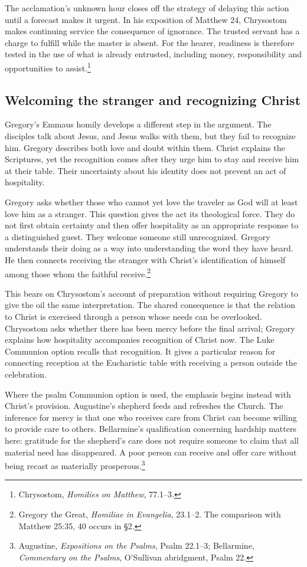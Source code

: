 The acclamation's unknown hour closes off the strategy of delaying this action until a forecast makes it urgent. In his exposition of Matthew 24, Chrysostom makes continuing service the consequence of ignorance. The trusted servant has a charge to fulfill while the master is absent. For the hearer, readiness is therefore tested in the use of what is already entrusted, including money, responsibility and opportunities to assist.\footnote{Chrysostom, \textit{Homilies on Matthew}, 77.1--3.}

\subsection{Welcoming the stranger and recognizing Christ}
Gregory's Emmaus homily develops a different step in the argument. The disciples talk about Jesus, and Jesus walks with them, but they fail to recognize him. Gregory describes both love and doubt within them. Christ explains the Scriptures, yet the recognition comes after they urge him to stay and receive him at their table. Their uncertainty about his identity does not prevent an act of hospitality.

Gregory asks whether those who cannot yet love the traveler as God will at least love him as a stranger. This question gives the act its theological force. They do not first obtain certainty and then offer hospitality as an appropriate response to a distinguished guest. They welcome someone still unrecognized. Gregory understands their doing as a way into understanding the word they have heard. He then connects receiving the stranger with Christ's identification of himself among those whom the faithful receive.\footnote{Gregory the Great, \textit{Homiliae in Evangelia}, 23.1--2. The comparison with Matthew 25:35, 40 occurs in §2.}

This bears on Chrysostom's account of preparation without requiring Gregory to give the oil the same interpretation. The shared consequence is that the relation to Christ is exercised through a person whose needs can be overlooked. Chrysostom asks whether there has been mercy before the final arrival; Gregory explains how hospitality accompanies recognition of Christ now. The Luke Communion option recalls that recognition. It gives a particular reason for connecting reception at the Eucharistic table with receiving a person outside the celebration.

Where the psalm Communion option is used, the emphasis begins instead with Christ's provision. Augustine's shepherd feeds and refreshes the Church. The inference for mercy is that one who receives care from Christ can become willing to provide care to others. Bellarmine's qualification concerning hardship matters here: gratitude for the shepherd's care does not require someone to claim that all material need has disappeared. A poor person can receive and offer care without being recast as materially prosperous.\footnote{Augustine, \textit{Expositions on the Psalms}, Psalm 22.1--3; Bellarmine, \textit{Commentary on the Psalms}, O'Sullivan abridgment, Psalm 22.}

